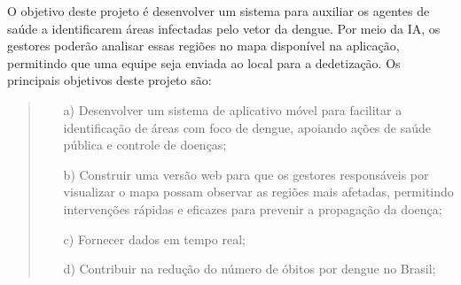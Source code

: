 
O objetivo deste projeto é desenvolver um sistema para auxiliar os agentes de saúde a identificarem áreas infectadas pelo vetor da dengue. Por meio da IA, os gestores poderão analisar essas regiões no mapa disponível na aplicação, permitindo que uma equipe seja enviada ao local para a dedetização. Os principais objetivos deste projeto são: 

\begin{quote}
\begin{itemize}
    \raggedright
    \item[a)]Desenvolver um sistema de aplicativo móvel para facilitar a identificação de áreas com foco de dengue, apoiando ações de saúde pública e controle de doenças;
    \item[b)]Construir uma versão web para que os gestores responsáveis por visualizar o mapa possam observar as regiões mais afetadas, permitindo intervenções rápidas e eficazes para prevenir a propagação da doença;
    \item[c)]Fornecer dados em tempo real; 
    \item[d)]Contribuir na redução do número de óbitos por dengue no Brasil; 
\end{itemize}
\end{quote}
 